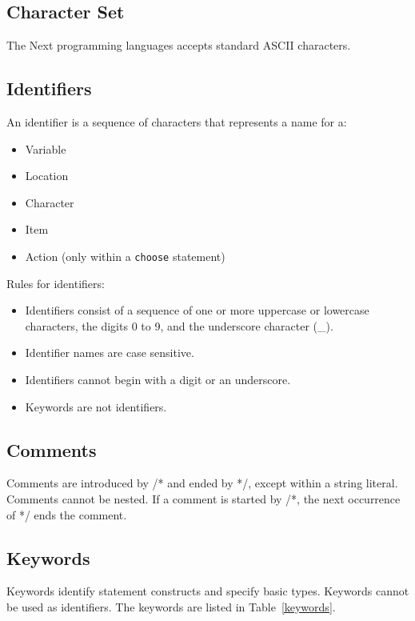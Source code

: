 \documentclass[12pt]{article}
\begin{document}
\subsection{Character Set}
The Next programming languages accepts standard ASCII characters.

\subsection{Identifiers}
An identifier is a sequence of characters that represents a name for a:
\begin{itemize}
\item Variable
\item Location
\item Character
\item Item
\item Action (only within a \texttt{choose} statement) \\
\end{itemize}

\noindent Rules for identifiers:
\begin{itemize}
\item Identifiers consist of a sequence of one or more uppercase or lowercase characters, the digits 0 to 9, and the underscore character (\_).
\item Identifier names are case sensitive.
\item Identifiers cannot begin with a digit or an underscore.
\item Keywords are not identifiers.
\end{itemize}

\subsection{Comments}
Comments are introduced by /* and ended by */, except within a string literal.
Comments cannot be nested.  If a comment is started by /*, the next occurrence of */ ends the comment.

\subsection{Keywords}
Keywords identify statement constructs and specify basic types.  Keywords cannot be used as identifiers.  The keywords are listed in Table~\ref{keywords}.
\end{document}

